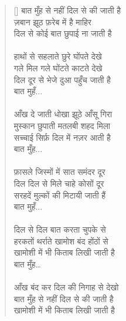 \begin{verse}[\versewidth]\texthindi{
बात मुँह से नहीं दिल से की जाती है\\
ज़बान झूठ फ़रेब में है माहिर\\
दिल से कोई बात छुपाई ना जाती है\\
\\
हाथों से सहलाते छुरे घोंपते देखे\\
गले मिल गले घोंटते काटते देखे\\
दिल दूर से भेजे दुआ पहुँच जाती है\\
बात मुहँ...\\
\\
आँख दे जाती धोखा झूठे आँसू गिरा\\
मुस्कान छुपाती मतलबी शहद मिला\\
सच्चाई सिर्फ़ दिल में नज़र आती है\\
बात मुँह...\\
\\
फ़ासले जिस्मों में सात समंदर दूर\\
दिल दिल से मिले चाहे कोसों दूर\\
सरहदें मुल्कों की मिटायी जाती हैं \\
बात मुहँ...\\
\\
दिल से दिल बात करता चुपके से\\
हरकतों थर्राते खामोश बंद होंठों से\\
खामोशी में भी किताब लिखी जाती है\\
बात मुँह…\\
\\
आँख बंद कर दिल की निगाह से देखो\\
बात मुँह से नहीं दिल से की जाती है\\
खामोशी में भी किताब लिखी जाती है
}\end{verse}

